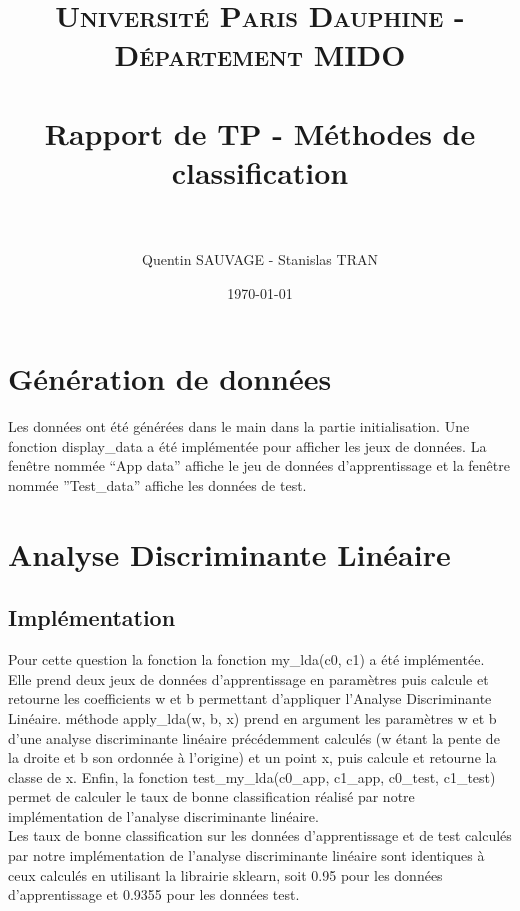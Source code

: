 \documentclass[paper=a4, fontsize=11pt]{scrartcl} %
\title{	
\normalfont \normalsize 
\textsc{Université Paris Dauphine - Département MIDO} \\ [25pt] %
\horrule{0.5pt} \\[0.4cm] %
\huge Rapport de TP - Méthodes de classification \\ %
\horrule{2pt} \\[0.5cm] %
}
\author{Quentin SAUVAGE - Stanislas TRAN} %
\date{\normalsize\today} %
\numberwithin{equation}{section} %
\numberwithin{figure}{section} %
\numberwithin{table}{section} %
\begin{document}
\begin{titlingpage}
\maketitle %
\end{titlingpage}
\newpage

\section{Génération de données}
	Les données ont été générées dans le main dans la partie initialisation. Une fonction display_data a été implémentée pour afficher les jeux de données.
	La fenêtre nommée “App data” affiche le jeu de données d’apprentissage et la fenêtre nommée ”Test_data” affiche les données de test.


\newpage
\section{Analyse Discriminante Linéaire}
	\subsection{Implémentation}
		Pour cette question la fonction la fonction my_lda(c0, c1) a été implémentée. Elle prend deux jeux de données d’apprentissage en paramètres puis calcule et retourne les coefficients w et b permettant d’appliquer l’Analyse Discriminante Linéaire.  		méthode apply_lda(w, b, x) prend en argument les paramètres w et b d’une analyse discriminante linéaire précédemment calculés (w étant la pente de la droite et b son ordonnée à l’origine) et un point x, puis calcule et retourne la classe de x. 			Enfin, la fonction test_my_lda(c0_app, c1_app, c0_test, c1_test) permet de calculer le taux de bonne classification réalisé par notre implémentation de l’analyse discriminante linéaire.\\

		Les taux de bonne classification sur les données d’apprentissage et de test calculés par notre implémentation de l’analyse discriminante linéaire sont identiques à ceux calculés en utilisant la librairie sklearn, soit 0.95 pour les données 					d’apprentissage et 0.9355 pour les données test.
\end{document}
